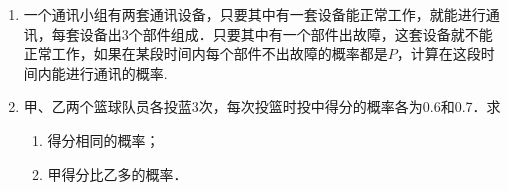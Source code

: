 \begin{enumerate}
\item 一个通讯小组有两套通讯设备，只要其中有一套设备能正常工作，就能进行通讯，每套设备出3个部件组成．只要其中有一个部件出故障，这套设备就不能正常工作，如果在某段时间内每个部件不出故障的概率都是$P$，计算在这段时间内能进行通讯的概率.
\item 甲、乙两个篮球队员各投蓝3次，每次投篮时投中得分的概率各为0.6和0.7．求
\begin{multicols}{2}
\begin{enumerate}[(1)]
    \item 得分相同的概率；
    \item 甲得分比乙多的概率．
\end{enumerate}    
\end{multicols}

\end{enumerate}


